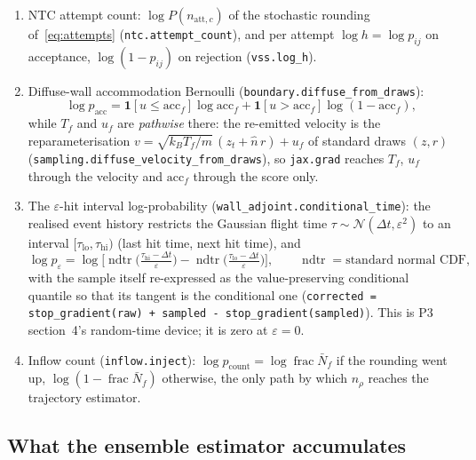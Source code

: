 \documentclass[11pt,a4paper]{article}
\numberwithin{equation}{section}
\newcommand{\ind}{\mathbf{1}}
\newcommand{\code}[1]{\texttt{#1}}
\begin{document}
\begin{enumerate}
\item NTC attempt count: $\log P(n_{\mathrm{att},c})$ of the stochastic rounding
  of~\eqref{eq:attempts} (\code{ntc.attempt\_count}), and per attempt
  $\log h = \log p_{ij}$ on acceptance, $\log(1 - p_{ij})$ on rejection (\code{vss.log\_h}).
\item Diffuse-wall accommodation Bernoulli (\code{boundary.diffuse\_from\_draws}):
  \begin{equation}
  \label{eq:acc-bernoulli}
  \log p_{\mathrm{acc}} = \ind[u \le \mathrm{acc}_f] \log \mathrm{acc}_f + \ind[u > \mathrm{acc}_f]\log(1 - \mathrm{acc}_f),
  \end{equation}
  while $T_f$ and $u_f$ are \emph{pathwise} there: the re-emitted velocity is the
  reparameterisation $v = \sqrt{k_B T_f/m}\,(z_t + \hat n\, r) + u_f$ of standard draws
  $(z, r)$ (\code{sampling.diffuse\_velocity\_from\_draws}), so \code{jax.grad} reaches
  $T_f$, $u_f$ through the velocity and $\mathrm{acc}_f$ through the score only.
\item The $\varepsilon$-hit interval log-probability (\code{wall\_adjoint.conditional\_time}):
  the realised event history restricts the Gaussian flight time
  $\tau \sim \mathcal N(\Delta t, \varepsilon^2)$ to an interval $[\tau_{\mathrm{lo}}, \tau_{\mathrm{hi}})$
  (last hit time, next hit time), and
  \begin{equation}
  \label{eq:eps-logp}
  \log p_\varepsilon = \log\Big[\operatorname{ndtr}\!\Big(\tfrac{\tau_{\mathrm{hi}} - \Delta t}{\varepsilon}\Big) - \operatorname{ndtr}\!\Big(\tfrac{\tau_{\mathrm{lo}} - \Delta t}{\varepsilon}\Big)\Big],
  \qquad \operatorname{ndtr} = \text{standard normal CDF},
  \end{equation}
  with the sample itself re-expressed as the value-preserving conditional quantile so
  that its tangent is the conditional one (\code{corrected = stop\_gradient(raw) + sampled - stop\_gradient(sampled)}).
  This is P3 section~4's random-time device; it is zero at $\varepsilon = 0$.
\item Inflow count (\code{inflow.inject}): $\log p_{\mathrm{count}} = \log\operatorname{frac}\bar N_f$
  if the rounding went up, $\log(1 - \operatorname{frac}\bar N_f)$ otherwise, the only path by
  which $n_\rho$ reaches the trajectory estimator.
\end{enumerate}

\subsection{What the ensemble estimator accumulates}
\label{sec:ensemble-scores}
\end{document}
